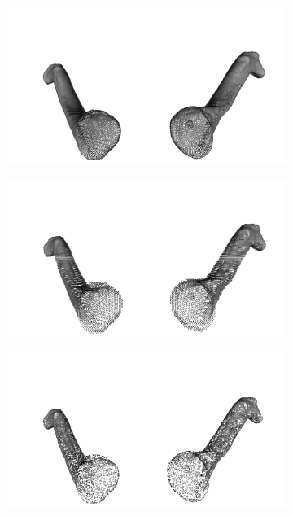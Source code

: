 \begin{figure}[htp]
  \begin{subfigure}[b]{.5\textwidth}
    \centering
    \includegraphics[width=.95\textwidth]{imagenes/chapter2/clavicula/clavicula_0.png}
    \caption{}
  \end{subfigure}
  \hfill
  \begin{subfigure}[b]{.5\textwidth}
    \centering
    \includegraphics[width=.95\textwidth]{imagenes/chapter2/clavicula/clavicula_1.png}
    \caption{}
  \end{subfigure}
  \begin{subfigure}[b]{.5\textwidth}
    \centering
    \includegraphics[width=.95\textwidth]{imagenes/chapter2/clavicula/clavicula_2.png}

\end{subfigure}
\end{figure}
